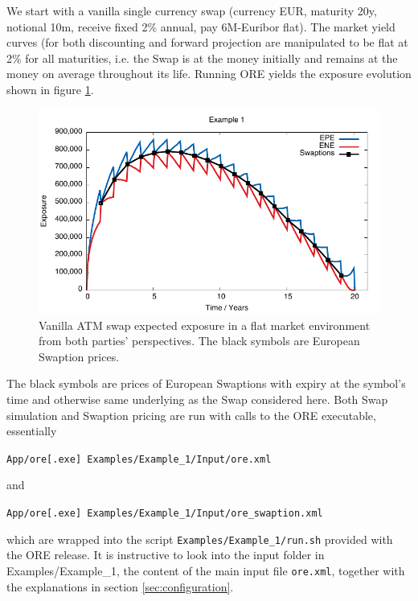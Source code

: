 \documentclass[12pt, a4paper]{article}
\begin{document}
We start with a vanilla single currency swap (currency EUR, maturity 20y, notional 10m, receive fixed 2\% annual, pay 6M-Euribor flat). The market yield curves (for both discounting and forward projection are manipulated to be flat at 2\% for all maturities, i.e. the Swap is at the money initially and remains at the money on average throughout its life. Running ORE yields the exposure evolution shown in figure \ref{fig_1}. 
\begin{figure}[hbt]
\begin{center}
\includegraphics[scale=1.0]{example_swap_1.pdf}
\end{center}
\caption{Vanilla ATM swap expected exposure in a flat market environment from both parties' perspectives. The black symbols are European Swaption prices.}
\label{fig_1}
\end{figure}
The black symbols are prices of European Swaptions with expiry at the symbol's time and otherwise same underlying as the Swap considered here. Both Swap simulation and Swaption pricing are run with calls to the ORE executable, essentially 

\medskip
\centerline{\tt App/ore[.exe] Examples/Example\_1/Input/ore.xml } 
\medskip
and

\medskip
\centerline{\tt App/ore[.exe] Examples/Example\_1/Input/ore\_swaption.xml }
\medskip
which are wrapped into the script {\tt Examples/Example\_1/run.sh}
provided with the ORE release.
It is instructive to look into the input folder in Examples/Example\_1, the content of the main input file {\tt ore.xml}, together with the explanations in section \ref{sec:configuration}.
\end{document}
